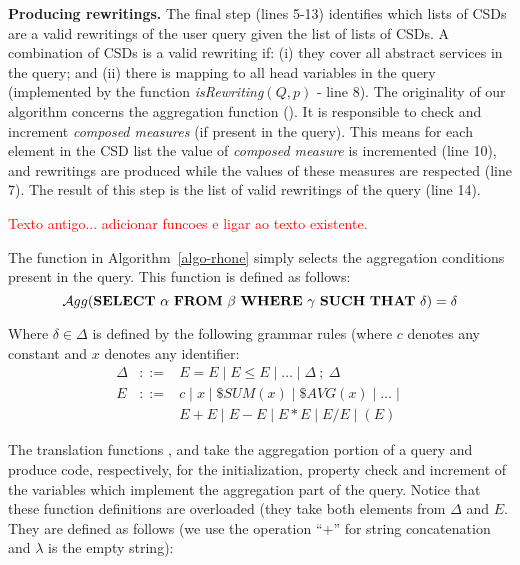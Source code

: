 \noindent \textbf{Producing rewritings.} The final step (lines 5-13) identifies which lists of CSDs are a valid
rewritings of the user query given the list of lists of CSDs.
A combination of CSDs is a valid rewriting if: (i) they cover all abstract services in the query; and 
(ii) there is mapping to all head variables in the query (implemented by the function \textit{isRewriting}$(Q, p)$ - line 8).
The originality of our algorithm concerns the aggregation function ().
It is responsible to check and increment \textit{composed measures} (if present in the query). 
This means for each element in the CSD list the value of \textit{composed measure} is incremented (line 10), and rewritings are produced while the values of these measures are respected (line 7). 
The result of this step is the list of valid 
 rewritings of the query (line 14).%
 
\textcolor{red}{Texto antigo... adicionar funcoes e ligar ao texto existente.} 
 
 The function \agg{\_} in Algorithm~\ref{algo-rhone} simply selects the aggregation conditions present in the query. 
This function is defined as follows:
\[
\agg{\mathbf{SELECT}\ \alpha\ \mathbf{FROM}\ \beta\ \mathbf{WHERE}\ \gamma\ \mathbf{SUCH\ THAT}\ \delta} = \delta 
\]

Where $\delta \in \Delta$ is defined by the following grammar rules (where $c$ denotes any constant and $x$ denotes any identifier:
\begin{eqnarray*}
\Delta & ::= & E = E \mid E \leq E \mid \dots \mid \Delta\ ;\ \Delta   \\
E      & ::= & c \mid x \mid \$\mathit{SUM(x)} \mid \$\mathit{AVG(x)} \mid \dots \mid \\
       &     & E + E \mid E - E \mid E * E \mid E / E \mid ( E )
\end{eqnarray*}

The translation functions \tqI{\_}, \tqT{\_} and \tqS{\_} take the aggregation portion of a query and produce code, respectively, for the initialization, property check and increment of the variables which implement the aggregation part of the query.
Notice that these function definitions are overloaded (they take both elements from $\Delta$ and $E$.
They are defined as follows (we use the operation ``+'' for string concatenation and $\lambda$ is the empty string):


